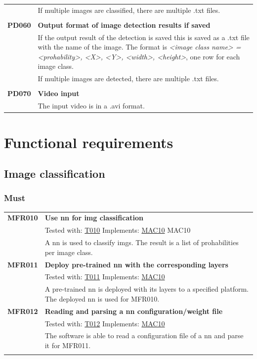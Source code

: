 \documentclass[parskip=full]{scrartcl}
\begin{document}
\begin{tabular}{p{2cm}p{11.4cm}}
& If multiple images are classified, there are multiple .txt files.\\
& \\
\textbf{PD060} & \textbf{Output format of image detection results if saved}\\
& If the output result of the detection is saved this is saved as a .txt file with the name of the image. The format is \textit{<image class name> = <prohability>, <X>, <Y>, <width>, <height>}, one row for each image class.\\
& If multiple images are detected, there are multiple .txt files.\\
& \\
\textbf{PD070} & \textbf{Video input}\\
& The input video is in a .avi format.
\end{tabular}
\newpage
\section{Functional requirements}
\subsection{Image classification}
\subsubsection{Must}
\begin{tabular}{p{2cm}p{11.4cm}}
\textbf{MFR010}\hypertarget{MFR010} & \textbf{Use \gls{nn} for \gls{img} classification}\\
& Tested with: \hyperlink{T010}{T010} Implements: \hyperlink{MAC10}{MAC10} MAC10 \\                                    
& A \gls{nn} is used to classify \glspl{img}. The result is a list of prohabilities per image class.\\
\textbf{MFR011}\hypertarget{MFR011} & \textbf{Deploy pre-trained \gls{nn} with the corresponding layers}\\
& Tested with: \hyperlink{T011}{T011} Implements: \hyperlink{MAC10}{MAC10} \\
& A pre-trained \gls{nn} is deployed with its layers to a specified platform. The deployed \gls{nn} is used for MFR010.\\
\textbf{MFR012} \hypertarget{MFR012}& \textbf{Reading and parsing a \gls{nn} configuration/weight file}\\
& Tested with: \hyperlink{T012}{T012} Implements: \hyperlink{MAC10}{MAC10} \\
& The software is able to read a configuration file of a \gls{nn} and parse it for MFR011.\\
& \\
\end{tabular}
\end{document}
